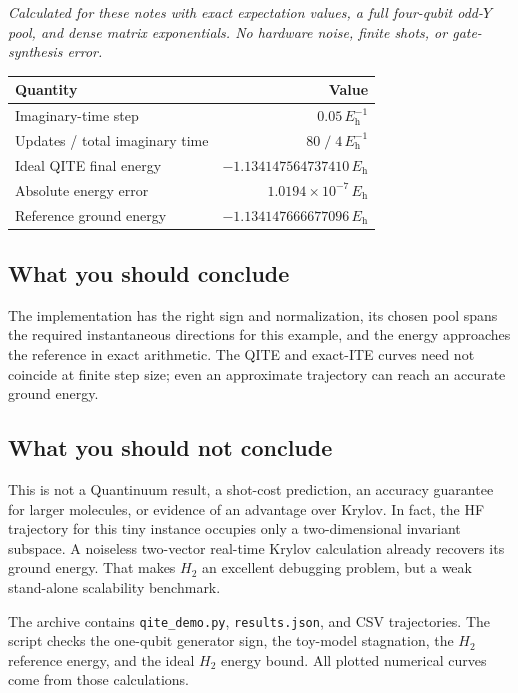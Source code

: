\documentclass[11pt,a4paper]{article}
\newcommand{\Eh}{E_{\mathrm h}}
\begin{document}
\small\textit{Calculated for these notes with exact expectation values, a full four-qubit odd-$Y$ pool, and dense matrix exponentials. No hardware noise, finite shots, or gate-synthesis error.}\normalsize

\begin{tabularx}{\linewidth}{@{}X r@{}}
\toprule
Quantity & Value\\\midrule
Imaginary-time step & $0.05\,\Eh^{-1}$\\
Updates / total imaginary time & $80\;/\;4\,\Eh^{-1}$\\
Ideal QITE final energy & $-1.134147564737410\,\Eh$\\
Absolute energy error & $1.0194\times10^{-7}\,\Eh$\\
Reference ground energy & $-1.134147666677096\,\Eh$\\\bottomrule
\end{tabularx}

\subsection*{What you should conclude}
The implementation has the right sign and normalization, its chosen pool spans the required instantaneous directions for this example, and the energy approaches the reference in exact arithmetic. The QITE and exact-ITE curves need not coincide at finite step size; even an approximate trajectory can reach an accurate ground energy.

\subsection*{What you should not conclude}
This is not a Quantinuum result, a shot-cost prediction, an accuracy guarantee for larger molecules, or evidence of an advantage over Krylov. In fact, the HF trajectory for this tiny instance occupies only a two-dimensional invariant subspace. A noiseless two-vector real-time Krylov calculation already recovers its ground energy. That makes $H_2$ an excellent debugging problem, but a weak stand-alone scalability benchmark.

\begin{idea}
The archive contains \texttt{qite\_demo.py}, \texttt{results.json}, and CSV trajectories. The script checks the one-qubit generator sign, the toy-model stagnation, the $H_2$ reference energy, and the ideal $H_2$ energy bound. All plotted numerical curves come from those calculations.
\end{idea}
\end{document}
